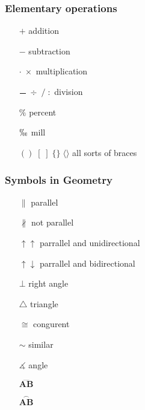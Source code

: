 \subsubsection{Elementary operations}
\begin{multicols}{2}
\begin{itemize}
 \item[$\mathbf{+}$] addition
 \item[$\mathbf{-}$] subtraction
 \item[$\mathbf{\cdot \; \times}$] multiplication
 \item[$\mathbf{\frac{\quad}{\quad}}\; \div\;/ \; :$] division
 \item[$\mathbf{\%}$] percent
 \item[$\mathbf{\permil}$] mill
 \item[$\mathbf{()\; [ \;] \; \{ \} \; \langle \rangle}$] all sorts of braces
\end{itemize}
\end{multicols}
\subsubsection{Symbols in Geometry}
\begin{multicols}{2}
\begin{itemize}
 \item[$\mathbf{\parallel}$] parallel
 \item[$\mathbf{\nparallel}$] not parallel
 \item[$\mathbf{\uparrow\uparrow}$] parrallel and unidirectional
 \item[$\mathbf{\uparrow\downarrow}$] parrallel and bidirectional
 \item[$\mathbf{\bot}$] right angle
 \item[$\mathbf{\triangle}$] triangle
 \item[$\mathbf{\cong}$] congurent
 \item[$\mathbf{\sim}$] similar
 \item[$\mathbf{\measuredangle}$] angle
 \item[$\mathbf{\overset{\mbox{---}}{AB}}$]
 \item[$\mathbf{\overset{\frown}{AB}}$]
\end{itemize}
\end{multicols}
